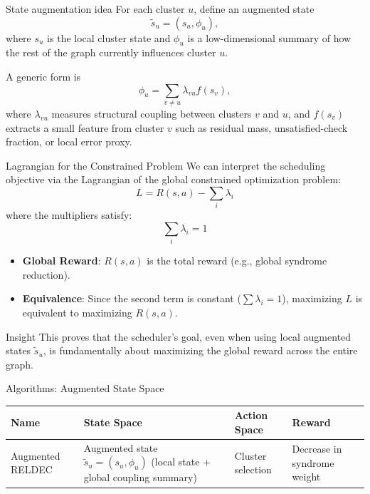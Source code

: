 \documentclass{beamer}
\begin{document}
\begin{frame}{State augmentation idea}
For each cluster $u$, define an augmented state
\[
\tilde s_u = (s_u, \phi_u),
\]
where $s_u$ is the local cluster state and $\phi_u$ is a low-dimensional summary of how the rest of the graph currently influences cluster $u$.

\vspace{0.4em}
A generic form is
\[
\phi_u = \sum_{v\neq u} \lambda_{vu} f(s_v),
\]
where $\lambda_{vu}$ measures structural coupling between clusters $v$ and $u$, and $f(s_v)$ extracts a small feature from cluster $v$ such as residual mass, unsatisfied-check fraction, or local error proxy.
\end{frame}

\begin{frame}{Lagrangian for the Constrained Problem}
We can interpret the scheduling objective via the Lagrangian of the global constrained optimization problem:
\[
L = R(s, a) - \sum_{i} \lambda_i
\]
where the multipliers satisfy:
\[
\sum_{i} \lambda_i = 1
\]
\begin{itemize}
    \item \textbf{Global Reward}: $R(s, a)$ is the total reward (e.g., global syndrome reduction).
    \item \textbf{Equivalence}: Since the second term is constant ($\sum \lambda_i = 1$), maximizing $L$ is equivalent to maximizing $R(s, a)$.
\end{itemize}
\begin{block}{Insight}
This proves that the scheduler's goal, even when using local augmented states $\tilde{s}_u$, is fundamentally about maximizing the global reward across the entire graph.
\end{block}
\end{frame}

\begin{frame}{Algorithms: Augmented State Space}
\begin{table}
\centering
\begin{tabularx}{\textwidth}{>{\raggedright\arraybackslash}p{2.5cm} X X X}
\toprule
\textbf{Name} & \textbf{State Space} & \textbf{Action Space} & \textbf{Reward} \\
\midrule
Augmented RELDEC & Augmented state $\tilde s_u = (s_u, \phi_u)$ (local state + global coupling summary) & Cluster selection & Decrease in syndrome weight \\
\bottomrule
\end{tabularx}
\end{table}
\end{frame}
\end{document}
